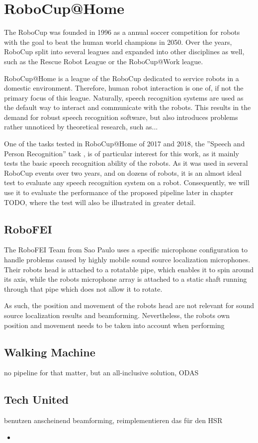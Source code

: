 
\section{RoboCup@Home}
The RoboCup was founded in 1996 as a annual soccer competition for robots with the goal to beat the human world champions in 2050.
Over the years, RoboCup split into several leagues and expanded into other disciplines as well, such as the Rescue Robot League or the RoboCup@Work league.

RoboCup@Home is a league of the RoboCup dedicated to service robots in a domestic environment. %
Therefore, human robot interaction is one of, if not the primary focus of this league.
Naturally, speech recognition systems are used as the default way to interact and communicate with the robots.
This results in the demand for robust speech recognition software, but also introduces problems rather unnoticed by theoretical research, such as...

One of the tasks tested in RoboCup@Home of 2017 and 2018, the ''Speech and Person Recognition'' task \cite{rulebook_2018}, is of particular interest for this work, as it mainly tests the basic speech recognition ability of the robots. 
As it was used in several RoboCup events over two years, and on dozens of robots, it is an almost ideal test to evaluate any speech recognition system on a robot.
Consequently, we will use it to evaluate the performance of the proposed pipeline later in chapter TODO, where the test will also be illustrated in greater detail. 

\subsection{RoboFEI}

The RoboFEI Team from Sao Paulo uses a specific microphone configuration to handle problems caused by highly mobile sound source localization microphones. %
Their robots head is attached to a rotatable pipe, which enables it to spin around its axis, while the robots microphone array is attached to a static shaft running through that pipe which does not allow it to rotate.

As such, the position and movement of the robots head are not relevant for sound source localization results and beamforming.
Nevertheless, the robots own position and movement needs to be taken into account when performing 


\subsection{Walking Machine}
no pipeline for that matter, but an all-inclusive solution, ODAS

\subsection{Tech United}
benutzen anscheinend beamforming, reimplementieren das für den HSR

\begin{itemize}
	\item 
\end{itemize}
